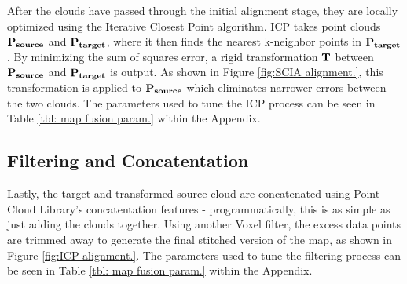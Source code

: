 \documentclass[letterpaper, oneside, 10pt]{report}
\begin{document}
    \noindent After the clouds have passed through the initial alignment stage, they are locally optimized using the Iterative Closest Point algorithm. ICP takes point clouds $\bf{P_{source}}$ and $\bf{P_{target}}$, where it then finds the nearest k-neighbor points in $\bf{P_{target}}$. By minimizing the sum of squares error, a rigid transformation $\bf{T}$ between $\bf{P_{source}}$ and $\bf{P_{target}}$ is output. As shown in Figure \ref{fig:SCIA alignment.}, this transformation is applied to $\bf{P_{source}}$ which eliminates narrower errors between the two clouds. The parameters used to tune the ICP process can be seen in Table \ref{tbl: map fusion param.} within the Appendix.

    \subsection{Filtering and Concatentation}

    Lastly, the target and transformed source cloud are concatenated using Point Cloud Library's concatentation features - programmatically, this is as simple as just adding the clouds together. Using another Voxel filter, the excess data points are trimmed away to generate the final stitched version of the map, as shown in Figure \ref{fig:ICP alignment.}. The parameters used to tune the filtering process can be seen in Table \ref{tbl: map fusion param.} within the Appendix. \\
\end{document}
